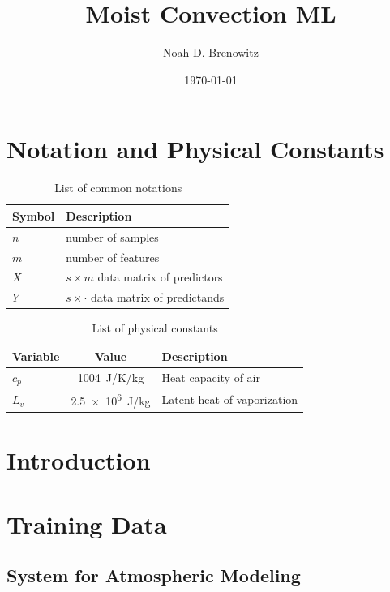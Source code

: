 \documentclass{report}
\title{Moist Convection ML}
\author{Noah D. Brenowitz}
\date{\today}
\newcommand{\1}[1]{\mathds{1}\left[#1\right]}
\begin{document}
\maketitle
\tableofcontents

\chapter*{Notation and Physical Constants}
\label{ch:notation}
\begin{table}
  \centering
  \begin{tabularx}{\textwidth}{lX}
    \toprule
    Symbol & Description\\
    \toprule
    $n$ & number of samples \\
    $m$ &  number of features\\
    $X$ & $s \times m$ data matrix of predictors\\
    $Y$ & $s \times \cdot $ data matrix of predictands\\
    \bottomrule
  \end{tabularx}
  
  \caption{List of common notations}
  \label{tab:constants}
\end{table}

\begin{table}
  \centering
  \begin{tabularx}{\textwidth}{lcX}
    \toprule
    Variable & Value & Description\\
    \toprule
    $c_p$ & \SI{1004}{J/K/kg} & Heat capacity of air\\
    $L_v$ & \SI{2.5e6}{J/kg} & Latent heat of vaporization\\
    \bottomrule
  \end{tabularx}
  
  \caption{List of physical constants}
  \label{tab:constants}
\end{table}
\chapter{Introduction}

\chapter{Training Data}

\section{System for Atmospheric Modeling}
\label{sec:sam}
\end{document}

